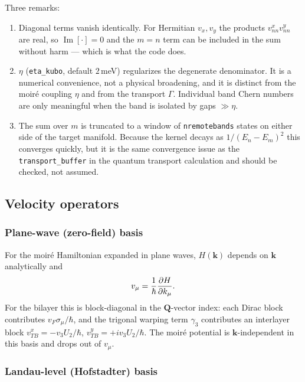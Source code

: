 \documentclass[11pt]{article}
\newcommand{\Imag}{\operatorname{Im}}
\newcommand{\kb}{\mathbf{k}}
\newcommand{\code}[1]{\texttt{#1}}
\begin{document}
Three remarks:
\begin{enumerate}
\item Diagonal terms vanish identically. For Hermitian $v_x, v_y$ the
  products $v^x_{nn} v^y_{nn}$ are real, so $\Imag[\cdot]=0$ and the
  $m=n$ term can be included in the sum without harm --- which is what
  the code does.
\item $\eta$ (\code{eta\_kubo}, default $2\,$meV) regularizes the
  degenerate denominator.  It is a numerical convenience, not a physical
  broadening, and it is distinct from the moir\'e coupling $\eta$ and
  from the transport $\Gamma$.  Individual band Chern numbers are only
  meaningful when the band is isolated by gaps $\gg \eta$.
\item The sum over $m$ is truncated to a window of \code{nremotebands}
  states on either side of the target manifold.  Because the kernel
  decays as $1/(E_n-E_m)^2$ this converges quickly, but it is the same
  convergence issue as the \code{transport\_buffer} in the quantum
  transport calculation and should be checked, not assumed.
\end{enumerate}

\subsection{Velocity operators}

\subsubsection{Plane-wave (zero-field) basis}

For the moir\'e Hamiltonian expanded in plane waves, $H(\kb)$ depends on
$\kb$ analytically and
\begin{equation}
  v_\mu = \frac{1}{\hbar}\pdv{H}{k_\mu}.
\end{equation}
For the bilayer this is block-diagonal in the $\mathbf{Q}$-vector index:
each Dirac block contributes $v_F \sigma_\mu/\hbar$, and the trigonal
warping term $\gamma_3$ contributes an interlayer block
$v^x_{TB} = -v_3 U_2/\hbar$, $v^y_{TB} = +i v_3 U_2 /\hbar$.  The moir\'e
potential is $\kb$-independent in this basis and drops out of $v_\mu$.

\subsubsection{Landau-level (Hofstadter) basis}\label{sec:vel_LL}
\end{document}
